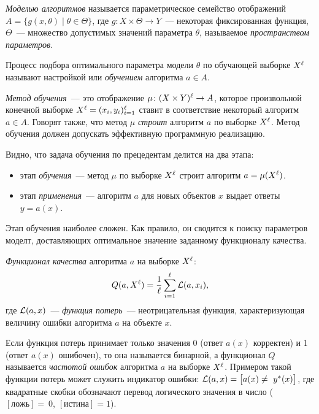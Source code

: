 \emph{Моделью алгоритмов} называется параметрическое семейство отображений
\( A = \bigl\{g(x,\theta)\mid\theta\in\Theta\bigr\} \), где \( g\colon X\times\Theta\to Y \)~---
некоторая фиксированная функция, \( \Theta \)~--- множество допустимых значений параметра \( \theta \),
называемое \emph{пространством параметров}.

Процесс подбора оптимального параметра модели \( \theta \) по обучающей выборке \( X^\ell \) называют
настройкой или \emph{обучением} алгоритма \( a\in A \).

\emph{Метод обучения}~--- это отображение \( \mu\colon (X\times Y)^\ell\to A \), которое произвольной
конечной выборке \( X^\ell = (x_i, y_i)_{i = 1}^\ell \) ставит в соответствие некоторый алгоритм
\( a\in A \). Говорят также, что метод \( \mu \) \emph{строит} алгоритм \( a \) по выборке \( X^\ell \).
Метод обучения должен допускать эффективную программную реализацию.

Видно, что задача обучения по прецедентам делится на два этапа:
\begin{itemize}
  \vspace*{-.8em}
  \itemsep -5pt
  \item[] этап \emph{обучения}~--- метод \( \mu \) по выборке \( X^\ell \) строит алгоритм
    \( a = \mu(X^\ell) \).
  \item[] этап \emph{применения}~--- алгоритм \( a \) для новых объектов \( x \) выдает ответы
    \( y = a(x) \).
\end{itemize}

Этап обучения наиболее сложен. Как правило, он сводится к поиску параметров моделт, доставляющих
оптимальное значение заданному функционалу качества.

\emph{Функционал качества} алгоритма \( a \) на выборке \( X^\ell \):
\begin{equation}
  Q(a, X^\ell) = \frac{1}{\ell}\sum_{i = 1}^\ell \mathcal{L}(a, x_i),
  \label{eq:1}
\end{equation}
где \( \mathcal{L}(a, x) \)~--- \emph{функция потерь}~--- неотрицательная функция, характеризующая величину
ошибки алгоритма \( a \) на объекте \( x \).

Если функция потерь принимает только значения 0 (ответ \( a(x) \) корректен) и 1 (ответ \( a(x) \)
ошибочен), то она называется бинарной, а функционал \( Q \) называется \emph{частотой ошибок} алгоритма
\( a \) на выборке \( X^\ell \). Примером такой функции потерь может служить индикатор ошибки:
\( \mathcal{L}(a, x) = \bigl[a(x)\ne~y^*(x)\bigr] \), где квадратные скобки обозначают перевод логического
значения в число\linebreak
(\( [\textit{ложь}] =~0 \), \( [\textit{истина}] = 1 \)).

